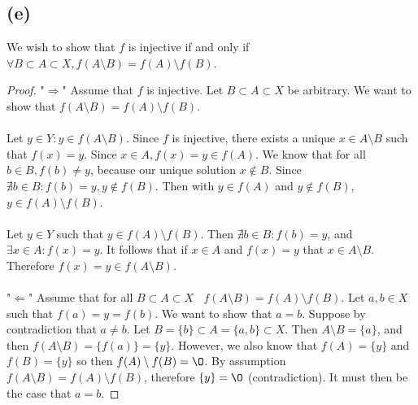\documentclass{article}
\begin{document}
\subsection*{(e)}
We wish to show that $f$ is injective if and only if $\forall B\subset A \subset X, f(A \setminus B) = f(A) \setminus f(B)$.
\begin{proof}
    "$\Rightarrow$" Assume that $f$ is injective. Let $B \subset A \subset X$ be arbitrary.
    We want to show that $f(A \setminus B) = f(A) \setminus f(B)$.
    \\\\
    \fbox{$\subset$}
    Let $y \in Y : y \in f(A \setminus B)$.
    Since $f$ is injective, there exists a unique $x \in A \setminus B$ such that $f(x) = y$.
    Since $x \in A, f(x) = y \in f(A)$.
    We know that for all $b \in B, f(b) \neq y$, because our unique solution $x \notin B$.
    Since $\nexists b \in B : f(b) = y, y \notin f(B)$.
    Then with $y \in f(A)$ and $y \notin f(B)$, $y \in f(A) \setminus f(B)$.
    \\\\
    \fbox{$\supset$}
    Let $y \in Y$ such that $y \in f(A) \setminus f(B)$.
    Then $\nexists b \in B : f(b) = y$, and $\exists x \in A : f(x) = y$.
    It follows that if $x \in A$ and $f(x) = y$ that $x \in A \setminus B$.
    Therefore $f(x) = y \in f(A \setminus B)$.
    \\\\
    "$\Leftarrow$" Assume that for all $B \subset A \subset X \ \ \ \ f(A \setminus B) = f(A) \setminus f(B)$.
    Let $a, b \in X$ such that $f(a) = y = f(b)$.
    We want to show that $a = b$.
    Suppose by contradiction that $a \neq b$.
    Let $B = \{b\} \subset A = \{a, b\} \subset X$.
    Then $A \setminus B= \{a\}$, and then $f(A \setminus B) = \{f(a)\} = \{y\}$.
    However, we also know that $f(A) = \{y\}$ and $f(B) = \{y\}$ so then $f(A) \setminus f(B) = \O$.
    By assumption $f(A \setminus B) = f(A) \setminus f(B)$, therefore $\{y\} = \O$ (contradiction).
    It must then be the case that $a = b$.
\end{proof}
\end{document}
